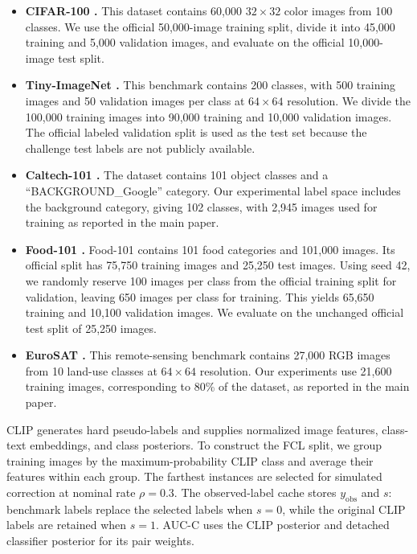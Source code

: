 \documentclass[10pt,twocolumn,letterpaper]{article}
\begin{document}
\begin{itemize}
    \item \textbf{CIFAR-100 \cite{krizhevsky2009cifar100}.} This dataset
    contains 60,000 $32\times32$ color images from 100 classes. We use the
    official 50,000-image training split, divide it into 45,000 training and
    5,000 validation images, and evaluate on the official 10,000-image test
    split.

    \item \textbf{Tiny-ImageNet \cite{le2015tinyimagenet}.} This benchmark
    contains 200 classes, with 500 training images and 50 validation images per
    class at $64\times64$ resolution. We divide the 100,000 training images
    into 90,000 training and 10,000 validation images. The official labeled
    validation split is used as the test set because the challenge test labels
    are not publicly available.

    \item \textbf{Caltech-101 \cite{fei2004caltech101}.} The dataset contains
    101 object classes and a ``BACKGROUND\_Google'' category. Our experimental
    label space includes the background category, giving 102 classes, with
    2,945 images used for training as reported in the main paper.
    

    \item \textbf{Food-101 \cite{bossard2014food101}.} Food-101 contains
    101 food categories and 101,000 images. Its official split has 75,750
    training images and 25,250 test images. Using seed 42, we randomly
    reserve 100 images per class from the official training split for
    validation, leaving 650 images per class for training. This yields
    65,650 training and 10,100 validation images. We evaluate on the
    unchanged official test split of 25,250 images.

    \item \textbf{EuroSAT \cite{helber2018eurosat}.} This remote-sensing
    benchmark contains 27,000 RGB images from 10 land-use classes at
    $64\times64$ resolution. Our experiments use 21,600 training images,
    corresponding to 80\% of the dataset, as reported in the main paper.
\end{itemize}

CLIP generates hard pseudo-labels and supplies normalized image features, class-text embeddings, and class posteriors. To construct the FCL split, we group training images by the maximum-probability CLIP class and average their features within each group. The farthest instances are selected for simulated correction at nominal rate $\rho=0.3$. The observed-label cache stores $y_{\mathrm{obs}}$ and $s$: benchmark labels replace the selected labels when $s=0$, while the original CLIP labels are retained when $s=1$. AUC-C uses the CLIP posterior and detached classifier posterior for its pair weights.
\end{document}
